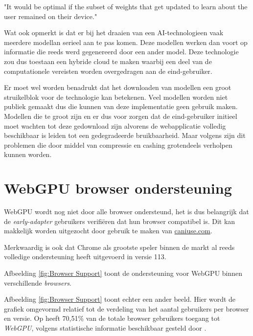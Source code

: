 \begin{displayquote}
    "It would be optimal if the subset of weights that get updated to learn about the user remained on their device."
\end{displayquote}

Wat \textcite{Fleetwood2022} ook opmerkt is dat er bij het draaien van een AI-technologieen vaak meerdere modellan serieel aan te pas komen. Deze modellen werken dan voort op informatie die reeds werd gegenereerd door een ander model. Deze technologie zou dus toestaan een hybride cloud te maken waarbij een deel van de computationele vereisten worden overgedragen aan de eind-gebruiker.

\bigbreak{}

Er moet wel worden benadrukt dat het downloaden van modellen een groot struikelblok voor de technologie kan betekenen. Veel modellen worden niet publiek gemaakt dus die kunnen van deze implementatie geen gebruik maken. Modellen die te groot zijn en er dus voor zorgen dat de eind-gebruiker initieel moet wachten tot deze gedownload zijn alvorens de webapplicatie volledig beschikbaar is leiden tot een gedegradeerde bruikbaarheid. Maar volgens \textcite{Fleetwood2022} zijn dit problemen die door middel van compressie en cashing grotendeels verholpen kunnen worden.

\break{}

\section{WebGPU browser ondersteuning}

WebGPU wordt nog niet door alle browser ondersteund, het is dus belangrijk dat de \textit{early-adapter} gebruikers verifiëren dat hun browser compatibel is. Dit kan makkelijk worden uitgezocht door gebruik te maken van \href{https://caniuse.com/webgpu}{caniuse.com}.

Merkwaardig is ook dat Chrome als grootste speler binnen de markt al reeds volledige ondersteuning heeft uitgevoerd in versie 113. \autocite{Deveria2024}

\bigbreak{}

Afbeelding \ref{fig:Browser Support} toont de ondersteuning voor WebGPU binnen verschillende \textit{browsers}.

\bigbreak{}
\date{}

Afbeelding \ref{fig:Browser Support} toont echter een ander beeld. Hier wordt de grafiek omgevormd relatief tot de verdeling van het aantal gebruikers per browser en versie. Op   heeft 70,51\% van de totale browser gebruikers toegang tot \textit{WebGPU}, volgens statistische informatie beschikbaar gesteld door \textcite{Deveria2024}.

